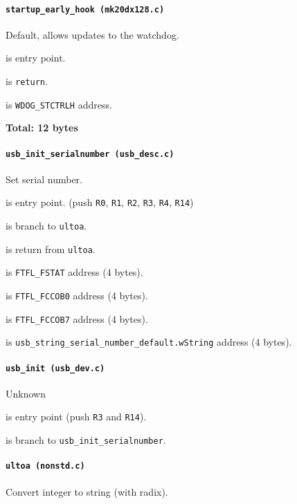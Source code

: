 \paragraph{\texttt{startup\_early\_hook (mk20dx128.c)}} Default, allows updates
to the watchdog.

 is entry point.

 is \texttt{return}.

 is \texttt{WDOG\_STCTRLH} address.

\textbf{Total: 12 bytes}

\paragraph{\texttt{usb\_init\_serialnumber (usb\_desc.c)}} Set serial number.

 is entry point.
(push \texttt{R0}, \texttt{R1}, \texttt{R2}, \texttt{R3},
\texttt{R4}, \texttt{R14})

 is branch to \texttt{ultoa}.

 is return from \texttt{ultoa}.

\vspace{1em}

 is \texttt{FTFL\_FSTAT} address (4 bytes).

 is \texttt{FTFL\_FCCOB0} address (4 bytes).

 is \texttt{FTFL\_FCCOB7} address (4 bytes).

 is {\scriptsize
\texttt{usb\_string\_serial\_number\_default.wString}} address (4 bytes).

\paragraph{\texttt{usb\_init (usb\_dev.c)}} Unknown

 is entry point (push \texttt{R3} and \texttt{R14}).

 is branch to \texttt{usb\_init\_serialnumber}.

\paragraph{\texttt{ultoa (nonstd.c)}} Convert integer to string (with radix).

